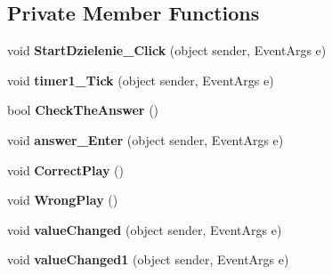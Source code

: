 \subsection*{Private Member Functions}
\begin{DoxyCompactItemize}
\item 
\mbox{\label{class_quiz___matematyczny_1_1_dzielenie_afeb38b2e9af454b7c06c0c0470af118f}} 
void {\bfseries Start\+Dzielenie\+\_\+\+Click} (object sender, Event\+Args e)
\item 
\mbox{\label{class_quiz___matematyczny_1_1_dzielenie_a0a3f76f2d23ea33f5141d0b29fd140a9}} 
void {\bfseries timer1\+\_\+\+Tick} (object sender, Event\+Args e)
\item 
\mbox{\label{class_quiz___matematyczny_1_1_dzielenie_ab852493e8cbd4c7f7cebd75486ec2253}} 
bool {\bfseries Check\+The\+Answer} ()
\item 
\mbox{\label{class_quiz___matematyczny_1_1_dzielenie_a09ed0124ff985661cee4eb05331e8e0a}} 
void {\bfseries answer\+\_\+\+Enter} (object sender, Event\+Args e)
\item 
\mbox{\label{class_quiz___matematyczny_1_1_dzielenie_aabada1cf5863e7caac12d95036f95f1c}} 
void {\bfseries Correct\+Play} ()
\item 
\mbox{\label{class_quiz___matematyczny_1_1_dzielenie_a2da6dee0a38880e854836d89d5450439}} 
void {\bfseries Wrong\+Play} ()
\item 
\mbox{\label{class_quiz___matematyczny_1_1_dzielenie_aa22833895b85c72a3b259d86cc41326f}} 
void {\bfseries value\+Changed} (object sender, Event\+Args e)
\item 
\mbox{\label{class_quiz___matematyczny_1_1_dzielenie_a3b7d9ce9909defbe3d43874285388dd8}} 
void {\bfseries value\+Changed1} (object sender, Event\+Args e)
\item 
\mbox{\label{class_quiz___matematyczny_1_1_dzielenie_a8a77dddc1fe6af41eb5bafdcebeb9ae6}} 

\end{DoxyCompactItemize}
